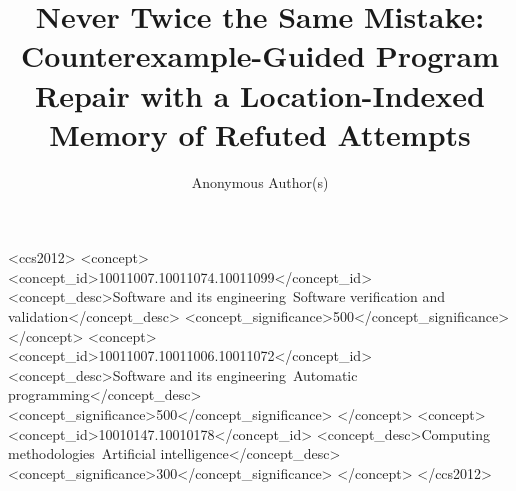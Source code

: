 \documentclass[acmsmall,screen,review,anonymous]{acmart}
\theoremstyle{acmdefinition}\newtheorem{assumption}{Assumption}}{}%
\theoremstyle{acmdefinition}\newtheorem{remark}[theorem]{Remark}}{}}
\begin{document}
\title{Never Twice the Same Mistake: Counterexample-Guided Program Repair
  with a Location-Indexed Memory of Refuted Attempts}

\author{Anonymous Author(s)}

\begin{abstract}

\end{abstract}

\begin{CCSXML}
<ccs2012>
<concept>
<concept_id>10011007.10011074.10011099</concept_id>
<concept_desc>Software and its engineering~Software verification and validation</concept_desc>
<concept_significance>500</concept_significance>
</concept>
<concept>
<concept_id>10011007.10011006.10011072</concept_id>
<concept_desc>Software and its engineering~Automatic programming</concept_desc>
<concept_significance>500</concept_significance>
</concept>
<concept>
<concept_id>10010147.10010178</concept_id>
<concept_desc>Computing methodologies~Artificial intelligence</concept_desc>
<concept_significance>300</concept_significance>
</concept>
</ccs2012>
\end{CCSXML}



\maketitle










% 







% 
\end{document}
